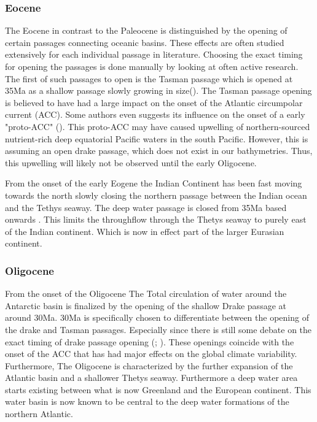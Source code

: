 \begin{multicols}{2}
\subsubsection{Eocene}
The Eocene in contrast to the Paleocene is distinguished by the opening of certain passages connecting oceanic basins. These effects are often studied extensively for each individual passage in literature. Choosing the exact timing for opening the passages is done manually by looking at often active research. The first of such passages to open is the Tasman passage which is opened at 35Ma as a shallow passage slowly growing in size(\cite{Lawver2003Sep}). The Tasman passage opening is believed to have had a large impact on the onset of the Atlantic circumpolar current (ACC). Some authors even suggests its influence on the onset of a early "proto-ACC" (\cite{Sarkar2019Jul}). This proto-ACC may have caused upwelling of northern-sourced nutrient-rich deep equatorial Pacific waters in the south Pacific. However, this is assuming an open drake passage, which does not exist in our bathymetries. Thus, this upwelling will likely not be observed until the early Oligocene. 

From the onset of the early Eogene the Indian Continent has been fast moving towards the north slowly closing the northern passage between the Indian ocean and the Tethys seaway. The deep water passage is closed from 35Ma based onwards \cite{Najman2010Dec}. This limits the throughflow through the Thetys seaway to purely east of the Indian continent. Which is now in effect part of the larger Eurasian continent. 

\subsubsection{Oligocene}
From the onset of the Oligocene The Total circulation of water around the Antarctic basin is finalized by the opening of the shallow Drake passage at around 30Ma. 30Ma is specifically chosen to differentiate between the opening of the drake and Tasman passages. Especially since there is still some debate on the exact timing of drake passage opening (\cite{Scher2006Apr}; \cite{Livermore2005Jul}). These openings coincide with the onset of the ACC that has had major effects on the global climate variability. Furthermore, The Oligocene is characterized by the further expansion of the Atlantic basin and a shallower Thetys seaway. Furthermore a deep water area starts existing between what is now Greenland and the European continent. This water basin is now known to be central to the deep water formations of the northern Atlantic.
\end{multicols}

